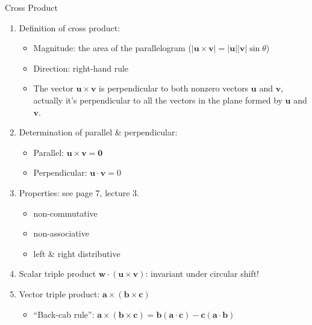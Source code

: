 \documentclass{beamer}
\begin{document}
\begin{frame}[allowframebreaks]{Cross Product}
	\begin{enumerate}
		\item Definition of cross product: 
		\begin{itemize}
			\item Magnitude: the area of
			the parallelogram ($|\mathbf{u}\times\mathbf{v}| = |\mathbf{u}||\mathbf{v}|\sin\theta$)
			\item Direction: right-hand rule
			\item The vector $\mathbf{u}\times\mathbf{v}$ is perpendicular to both nonzero vectors $\mathbf{u}$ and $\mathbf{v}$, actually it's perpendicular to all the vectors in the plane formed by $\mathbf{u}$ and $\mathbf{v}$.
			\end{itemize}
			\item Determination of parallel \& perpendicular:
			\begin{itemize}
				\item Parallel: $\mathbf{u}\times\mathbf{v} = \mathbf{0}$
				\item Perpendicular: $\mathbf{u}\cdot\mathbf{v} = 0$
			\end{itemize}
			\item Properties: see page 7, lecture 3.
			\begin{itemize}
				\item \alert{non-commutative}
				\item \alert{non-associative}
				\item left \& right distributive
			\end{itemize}
		
		\item Scalar triple product $\mathbf{w}\cdot(\mathbf{u}\times\mathbf{v})$:\alert{ invariant under circular shift}!
		
		\item {\color{green} Vector triple product}: $\mathbf{a}\times(\mathbf{b}\times\mathbf{c})$
		\begin{itemize}
			\item ``Back-cab rule'': $\mathbf{a}\times(\mathbf{b}\times\mathbf{c}) = \mathbf{b}(\mathbf{a}\cdot\mathbf{c}) - \mathbf{c}(\mathbf{a}\cdot\mathbf{b})$
		\end{itemize}
	\end{enumerate}
	
	
\end{frame}
\end{document}
